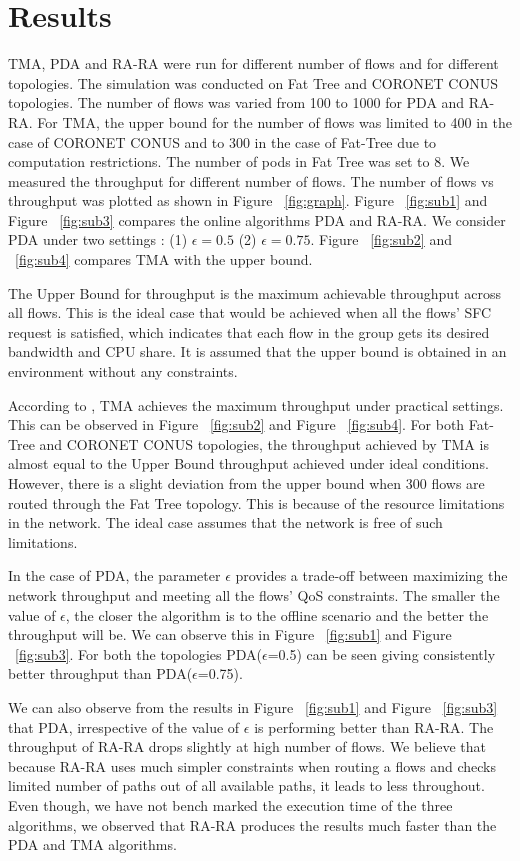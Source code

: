 \section{Results}
\label{sec:results}

TMA, PDA and RA-RA were run for different number of flows and for different topologies. The simulation was conducted on Fat Tree and CORONET CONUS topologies. The number of flows was varied from 100 to 1000 for PDA and RA-RA. For TMA, the upper bound for the number of flows was limited to 400 in the case of CORONET CONUS and to 300 in the case of Fat-Tree due to computation restrictions.  The number of pods in Fat Tree was set to 8. We measured the throughput for different number of flows. The number of flows vs throughput was plotted as shown in Figure ~\ref{fig:graph}. Figure ~\ref{fig:sub1} and Figure ~\ref{fig:sub3} compares the online algorithms PDA and RA-RA. We consider PDA under two settings : (1) $\epsilon = 0.5$ (2) $\epsilon = 0.75$. Figure ~\ref{fig:sub2} and ~\ref{fig:sub4} compares TMA with the upper bound.

The Upper Bound for throughput is the maximum achievable throughput across all flows. This is the ideal case that would be achieved when all the flows' SFC request is satisfied, which indicates that each flow in the group gets its desired bandwidth and CPU share. It is assumed that the upper bound is obtained in an environment without any constraints.

According to \cite{ref:paper1}, TMA achieves the maximum throughput under practical settings. This can be observed in Figure ~\ref{fig:sub2} and Figure ~\ref{fig:sub4}. For both Fat-Tree and CORONET CONUS topologies, the throughput achieved by TMA is almost equal to the Upper Bound throughput achieved under ideal conditions. However, there is a slight deviation from the upper bound when 300 flows are routed through the Fat Tree topology. This is because of the resource limitations in the network. The ideal case assumes that the network is free of such limitations.

In the case of PDA, the parameter $\epsilon$ provides a trade-off between maximizing the network throughput and meeting all the flows' QoS constraints. The smaller the value of $\epsilon$, the closer the algorithm is to the offline scenario and the better the throughput will be. We can observe this in Figure ~\ref{fig:sub1} and Figure ~\ref{fig:sub3}. For both the topologies PDA($\epsilon$=0.5) can be seen giving consistently better throughput than PDA($\epsilon$=0.75). 

We can also observe from the results in Figure ~\ref{fig:sub1} and Figure ~\ref{fig:sub3} that PDA, irrespective of the value of $\epsilon$ is performing better than RA-RA. The throughput of RA-RA drops slightly at high number of flows. We believe that because RA-RA uses much simpler constraints when routing a flows and checks limited number of paths out of all available paths, it leads to less throughout. Even though, we have not bench marked the execution time of the three algorithms, we observed that RA-RA produces the results much faster than the PDA and TMA algorithms. 
